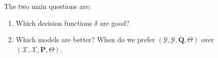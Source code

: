   The two main questions are: 
  \begin{enumerate}
    \item Which decision functions $\delta$ are good? 
    \item Which models are better? When do we prefer $(\mathcal{Y}, \mathscr{Y}, \mathbf{Q}, \Theta)$ over $(\mathcal{X}, \mathscr{X}, \mathbf{P}, \Theta)$.
  \end{enumerate}

  \begin{example}
    \label{ex:point-estimation}
    
  \end{example}

  \begin{example}
    \label{ex:hypothesis-testing}
    
  \end{example}

  \begin{example}
    \label{ex:confidence-sets}
    
  \end{example}

  \begin{example}
    \label{ex:density-estimation}
    
  \end{example}

